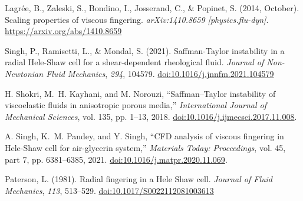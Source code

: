 \documentclass[12pt,a4paper]{article}
\begin{document}
\begin{thebibliography}{09}
Lagrée, B., Zaleski, S., Bondino, I., Josserand, C., \& Popinet, S. (2014, October). Scaling properties of viscous fingering. \textit{arXiv:1410.8659 [physics.flu-dyn]}. \url{https://arxiv.org/abs/1410.8659}

Singh, P., Ramisetti, L., \& Mondal, S. (2021). Saffman-Taylor instability in a radial Hele-Shaw cell for a shear-dependent rheological fluid. \textit{Journal of Non-Newtonian Fluid Mechanics}, \textit{294}, 104579. \href{https://doi.org/10.1016/j.jnnfm.2021.104579}{doi:10.1016/j.jnnfm.2021.104579}


H. Shokri, M.~H. Kayhani, and M. Norouzi,
``Saffman–Taylor instability of viscoelastic fluids in anisotropic porous media,''
\textit{International Journal of Mechanical Sciences}, vol. 135, pp. 1--13, 2018.
\href{https://doi.org/10.1016/j.ijmecsci.2017.11.008}{doi:10.1016/j.ijmecsci.2017.11.008}.


A. Singh, K.~M. Pandey, and Y. Singh,
``CFD analysis of viscous fingering in Hele-Shaw cell for air-glycerin system,''
\textit{Materials Today: Proceedings}, vol. 45, part 7, pp. 6381--6385, 2021.
\href{https://doi.org/10.1016/j.matpr.2020.11.069}{doi:10.1016/j.matpr.2020.11.069}.


Paterson, L. (1981). Radial fingering in a Hele Shaw cell. \textit{Journal of Fluid Mechanics}, \textit{113}, 513--529. \href{https://doi.org/10.1017/S0022112081003613}{doi:10.1017/S0022112081003613}



\end{thebibliography}
\end{document}
